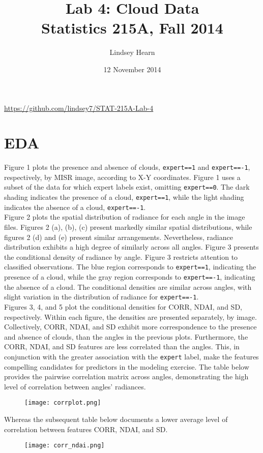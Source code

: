 \documentclass[11pt]{article}
\begin{document}
\title{\large Lab 4: Cloud Data\\Statistics 215A, Fall 2014}
\author{Lindsey Hearn}
\date{12 November 2014}
\maketitle

\begin{center}\url{https://github.com/lindsey7/STAT-215A-Lab-4}\end{center}

\section{EDA}
Figure 1 plots the presence and absence of clouds, \texttt{expert==1} and \texttt{expert==-1}, respectively, by MISR image, according to X-Y coordinates.   Figure 1 uses a subset of the data for which expert labels exist, omitting \texttt{expert==0}.  The dark shading indicates the presence of a cloud, \texttt{expert==1}, while the light shading indicates the absence of a cloud, \texttt{expert==-1}. \\
\indent Figure 2 plots the spatial distribution of radiance for each angle in the image files.  Figures 2 (a), (b), (c) present markedly similar spatial distributions, while figures 2 (d) and (e) present similar arrangements.  Nevertheless, radiance distribution exhibits a high degree of similarly across all angles.  Figure 3 presents the conditional density of radiance by angle. Figure 3 restricts attention to classified observations.  The blue region corresponds to \texttt{expert==1}, indicating the presence of a cloud, while the gray region corresponds to \texttt{expert==-1}, indicating the absence of a cloud.  The conditional densities are similar across angles, with slight variation in the distribution of radiance for \texttt{expert==-1}.\\
\indent Figures 3, 4, and 5 plot the conditional densities for CORR, NDAI, and SD, respectively. Within each figure, the densities are presented separately, by image.  Collectively, CORR, NDAI, and SD exhibit more correspondence to the presence and absence of clouds, than the angles in the previous plots. Furthermore, the CORR, NDAI, and SD features are less correlated than the angles. This, in conjunction with the greater association with the \texttt{expert} label, make the features compelling candidates for predictors in the modeling exercise. The table below provides the pairwise correlation matrix across angles, demonstrating the high level of correlation between angles' radiances.  
\begin{figure}[!h]
\centering
\texttt{[image: corrplot.png]}
\end{figure}
Whereas the subsequent table below documents a lower average level of correlation between features CORR, NDAI, and SD. 
\begin{figure}[!h]
\centering
\texttt{[image: corr\_ndai.png]}
\end{figure}
\end{document}
